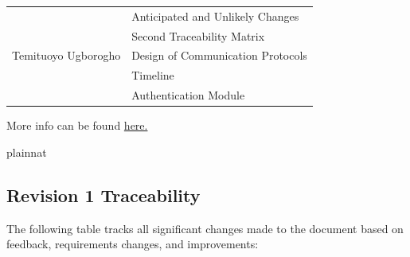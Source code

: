 \documentclass[12pt, titlepage]{article}
\begin{document}
\begin{center}
\begin{tabular}{| p{} | p{} |}
    \midrule

    \multirow{5}{0.3\textwidth}{Temituoyo Ugborogho}
                & Anticipated and Unlikely Changes  \\
                & Second Traceability Matrix        \\
                & Design of Communication Protocols \\
                & Timeline                          \\
                & Authentication Module             \\

    \bottomrule
  \end{tabular}
\end{center}

More info can be found \href{https://github.com/dcheung11/team-6-capstone-project}{here.}

 {plainnat}


\newpage{}

\subsection{Revision 1 Traceability}
The following table tracks all significant changes made to the document based on feedback, requirements changes, and improvements:

\newcommand{\issueLink}[1]{\href{https://github.com/dcheung11/team-6-capstone-project/issues/#1}{Issue #1}}
\end{document}
